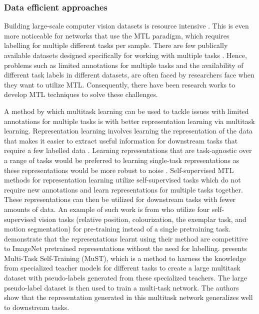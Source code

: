 \documentclass[times,twocolumn,final]{elsarticle}
\begin{document}
\subsubsection{Data efficient approaches}
Building large-scale computer vision datasets is resource intensive \citep{Liao_2021_CVPR}. This is even more noticeable for networks that use the MTL paradigm, which requires labelling for multiple different tasks per sample. There are few publically available datasets designed specifically for working with multiple tasks \citep{zamir2018taskonomy,yu2020meta}.
Hence, problems such as limited annotations for multiple tasks and the availability of different task labels in different datasets, are often faced by researchers face when they want to utilize MTL. Consequently, there have been research works to develop MTL techniques to solve these challenges.   

A method by which multitask learning can be used to tackle issues with limited annotations for multiple tasks is with better representation learning via multitask learning. Representation learning involves learning the representation of the data that makes it easier to extract useful information for downstream tasks that require a few labelled data \citep{bengio2013representation}. Learning representations that are task-agnostic over a range of tasks would be preferred to learning single-task representations as these representations would be more robust to noise \citep{nguyen2022task}. Self-supervised MTL methods for representation learning utilize self-supervised tasks which do not require new annotations and learn representations for multiple tasks together.
These representations can then be utilized for downstream tasks with fewer amounts of data. 
An example of such work is from \citet{doersch2017multi} who utilize four self-supervised vision tasks (relative position, colourization, the exemplar task, and motion segmentation) for pre-training instead of a single pretraining task.
\citet{doersch2017multi} demonstrate that the representations learnt using their method are competitive to ImageNet pretrained representations without the need for labelling. \citet{Ghiasi_2021_ICCV} presents Multi-Task Self-Training (MuST), which is a method to harness the knowledge from specialized teacher models for different tasks to create a large multitask dataset with pseudo-labels generated from these specialized teachers. The large pseudo-label dataset is then used to train a multi-task network. The authors show that the representation generated in this multitask network generalizes well to downstream tasks. 
\end{document}
